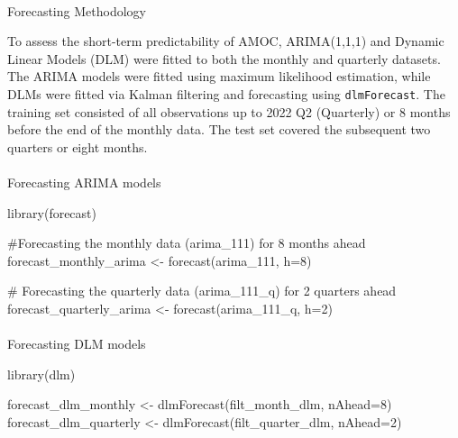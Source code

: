 \documentclass[
  11pt,
]{article}
\makeatletter
\let\oldparagraph\paragraph
\renewcommand{\paragraph}{
    \@ifstar
      \xxxParagraphStar
      \xxxParagraphNoStar
  }
\newcommand{\xxxParagraphStar}[1]{\oldparagraph*{#1}\mbox{}}
\newcommand{\xxxParagraphNoStar}[1]{\oldparagraph{#1}\mbox{}}
\newenvironment{Shaded}{\begin{snugshade}}{\end{snugshade}}
\newcommand{\AttributeTok}[1]{\textcolor[rgb]{0.40,0.45,0.13}{#1}}
\newcommand{\CommentTok}[1]{\textcolor[rgb]{0.37,0.37,0.37}{#1}}
\newcommand{\DecValTok}[1]{\textcolor[rgb]{0.68,0.00,0.00}{#1}}
\newcommand{\FunctionTok}[1]{\textcolor[rgb]{0.28,0.35,0.67}{#1}}
\newcommand{\NormalTok}[1]{\textcolor[rgb]{0.00,0.23,0.31}{#1}}
\newcommand{\OtherTok}[1]{\textcolor[rgb]{0.00,0.23,0.31}{#1}}
\makeatother
\begin{document}
\paragraph{Forecasting Methodology}\label{forecasting-methodology}

To assess the short-term predictability of AMOC, ARIMA(1,1,1) and
Dynamic Linear Models (DLM) were fitted to both the monthly and
quarterly datasets. The ARIMA models were fitted using maximum
likelihood estimation, while DLMs were fitted via Kalman filtering and
forecasting using \texttt{dlmForecast}. The training set consisted of
all observations up to 2022 Q2 (Quarterly) or 8 months before the end of
the monthly data. The test set covered the subsequent two quarters or
eight months.

\paragraph{Forecasting ARIMA models}\label{forecasting-arima-models}

\begin{Shaded}
\begin{Highlighting}[]
\FunctionTok{library}\NormalTok{(forecast)}

\CommentTok{\#Forecasting the monthly data (arima\_111) for 8 months ahead}
\NormalTok{forecast\_monthly\_arima }\OtherTok{\textless{}{-}} \FunctionTok{forecast}\NormalTok{(arima\_111, }\AttributeTok{h=}\DecValTok{8}\NormalTok{)}

\CommentTok{\# Forecasting the quarterly data (arima\_111\_q) for 2 quarters ahead}
\NormalTok{forecast\_quarterly\_arima }\OtherTok{\textless{}{-}} \FunctionTok{forecast}\NormalTok{(arima\_111\_q, }\AttributeTok{h=}\DecValTok{2}\NormalTok{)}
\end{Highlighting}
\end{Shaded}

\paragraph{Forecasting DLM models}\label{forecasting-dlm-models}

\begin{Shaded}
\begin{Highlighting}[]
\FunctionTok{library}\NormalTok{(dlm)}

\NormalTok{forecast\_dlm\_monthly }\OtherTok{\textless{}{-}} \FunctionTok{dlmForecast}\NormalTok{(filt\_month\_dlm, }\AttributeTok{nAhead=}\DecValTok{8}\NormalTok{)}
\NormalTok{forecast\_dlm\_quarterly }\OtherTok{\textless{}{-}} \FunctionTok{dlmForecast}\NormalTok{(filt\_quarter\_dlm, }\AttributeTok{nAhead=}\DecValTok{2}\NormalTok{)}
\end{Highlighting}
\end{Shaded}
\end{document}
